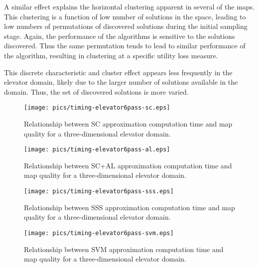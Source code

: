 A similar effect explains the horizontal clustering apparent in several of the maps.  This clustering is a function of low number of solutions in the space, leading to low numbers of permutations of discovered solutions during the initial sampling stage.  Again, the performance of the algorithms is sensitive to the solutions discovered.  Thus the same permutation tends to lead to similar performance of the algorithm, resulting in clustering at a specific utility loss measure.


This discrete characteristic and cluster effect appears less frequently in the elevator domain, likely due to the larger number of solutions available in the domain.  Thus, the set of discovered solutions  is more varied.




\begin{figure}
\begin{center}
\texttt{[image: pics/timing-elevator6pass-sc.eps]}
\caption{Relationship between SC approximation computation time and map quality for a three-dimensional elevator domain.}
\label{fig:timing-elevator6pass-sc}
\end{center}
\end{figure}

\begin{figure}
\begin{center}
\texttt{[image: pics/timing-elevator6pass-al.eps]}
\caption{Relationship between SC+AL approximation computation time and map quality for a three-dimensional elevator domain.}
\label{fig:timing-elevator6pass-al}
\end{center}
\end{figure}

\begin{figure}
\begin{center}
\texttt{[image: pics/timing-elevator6pass-sss.eps]}
\caption{Relationship between SSS approximation computation time and map quality for a three-dimensional elevator domain.}
\label{fig:timing-elevator6pass-sss}
\end{center}
\end{figure}

\begin{figure}
\begin{center}
\texttt{[image: pics/timing-elevator6pass-svm.eps]}
\caption{Relationship between SVM approximation computation time and map quality for a three-dimensional elevator domain.}
\label{fig:timing-elevator6pass-svm}
\end{center}
\end{figure}

